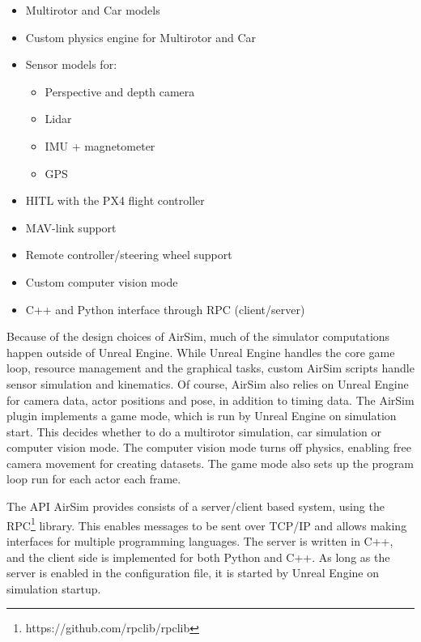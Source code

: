 \begin{itemize}
    \itemsep 0em
    \item Multirotor and Car models
    \item Custom physics engine for Multirotor and Car
    \item Sensor models for:
    \begin{itemize}
    \itemsep -0.2em
        \item Perspective and depth camera
        \item Lidar
        \item IMU + magnetometer
        \item GPS
    \end{itemize}
    \item HITL with the PX4 flight controller
    \item MAV-link support
    \item Remote controller/steering wheel support
    \item Custom computer vision mode
    \item C++ and Python interface through RPC (client/server)
\end{itemize}

Because of the design choices of AirSim, much of the simulator computations happen outside of Unreal Engine. While Unreal Engine handles the core game loop, resource management and the graphical tasks, custom AirSim scripts handle sensor simulation and kinematics. Of course, AirSim also relies on Unreal Engine for camera data, actor positions and pose, in addition to timing data. The AirSim plugin implements a game mode, which is run by Unreal Engine on simulation start. This decides whether to do a multirotor simulation, car simulation or computer vision mode. The computer vision mode turns off physics, enabling free camera movement for creating datasets. The game mode also sets up the program loop run for each actor each frame.

The API AirSim provides consists of a server/client based system, using the RPC\footnote{https://github.com/rpclib/rpclib} library. This enables messages to be sent over TCP/IP and allows making interfaces for multiple programming languages. The server is written in C++, and the client side is implemented for both Python and C++. As long as the server is enabled in the configuration file, it is started by Unreal Engine on simulation startup. 

